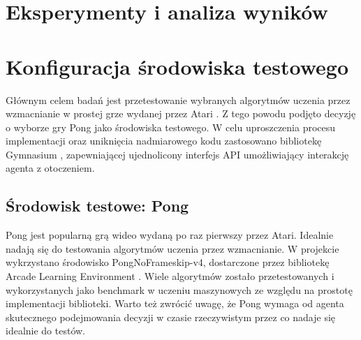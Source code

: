 \documentclass[a4paper, 12pt]{article}
\numberwithin{equation}{section}
\begin{document}
    \section{Eksperymenty i analiza wyników}
    \section{Konfiguracja środowiska testowego}
    Głównym celem badań jest przetestowanie wybranych algorytmów uczenia przez wzmacnianie w prostej grze wydanej przez Atari \cite{bellemare2013arcade}. Z tego powodu podjęto decyzję o wyborze gry Pong jako środowiska testowego. W celu uproszczenia procesu implementacji oraz uniknięcia nadmiarowego kodu zastosowano bibliotekę Gymnasium \cite{gymnasium2025}, zapewniającej ujednolicony interfejs API umożliwiający interakcję agenta z otoczeniem.
    \subsection{Środowisk testowe: Pong}
    Pong jest popularną grą wideo wydaną po raz pierwszy przez Atari. Idealnie nadają się do testowania algorytmów uczenia przez wzmacnianie. W projekcie wykrzystano środowisko PongNoFrameskip-v4, dostarczone przez bibliotekę Arcade Learning Environment \cite{bellemare2013arcade}. Wiele algorytmów zostało przetestowanych i wykorzystanych jako benchmark w uczeniu maszynowych ze względu na prostotę implementacji biblioteki. Warto też zwrócić
    uwagę, że Pong wymaga od agenta skutecznego podejmowania decyzji w czasie rzeczywistym przez co nadaje się idealnie do testów.
\end{document}
